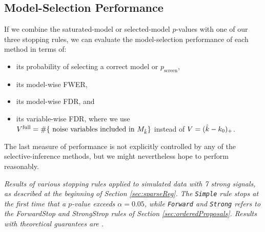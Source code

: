 \documentclass{article}
\begin{document}
\subsection{Model-Selection Performance}

If we combine the saturated-model or selected-model $p$-values with one of our three stopping rules, we can evaluate the model-selection performance of each method in terms of:
\begin{itemize}
\item its probability of selecting a correct model or $p_{\text{screen}}$,
\item its model-wise FWER,
\item its model-wise FDR, and
\item its variable-wise FDR, where we use $V^{\text{full}}= \#\{\text{ noise variables included in } M_{\hat{k}}\}$ instead of $V=(\hat{k}-k_0)_+$.
\end{itemize} 
The last measure of performance is not explicitly controlled by any of the selective-inference methods, but we might nevertheless hope to perform reasonably.


\begin{table}[ht]
\centering

\caption[tab:stopping]{\em Results of various stopping rules applied to simulated data with 7 strong signals,  as described at the beginning of Section \ref{sec:sparseReg}.
The {\tt Simple} rule stops at the first time that a $p$-value exceeds $\alpha=0.05$, while {\tt Forward} and {\tt Strong} refers to the ForwardStop and StrongStrop rules of Section \ref{sec:orderedProposals}. Results with theoretical guarantees are .}
\label{tab:stopping05}
\end{table}
\end{document}
